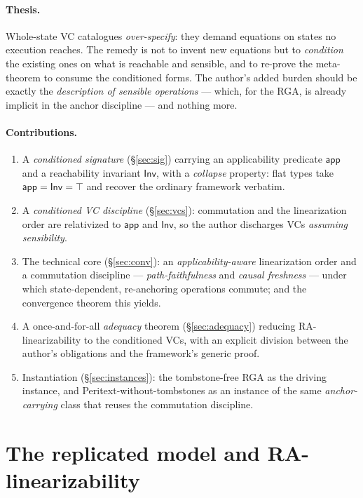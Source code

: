 \documentclass[11pt]{article}
\newcommand{\Inv}{\mathsf{Inv}}
\newcommand{\app}{\mathsf{app}}
\begin{document}
\paragraph{Thesis.}
Whole-state VC catalogues \emph{over-specify}: they demand equations on states no
execution reaches. The remedy is not to invent new equations but to
\emph{condition} the existing ones on what is reachable and sensible, and to
re-prove the meta-theorem to consume the conditioned forms. The author's added
burden should be exactly the \emph{description of sensible operations} --- which,
for the RGA, is already implicit in the anchor discipline --- and nothing more.

\paragraph{Contributions.}
\begin{enumerate}[leftmargin=1.6em]
\item A \emph{conditioned signature} (\S\ref{sec:sig}) carrying an applicability
  predicate $\app$ and a reachability invariant $\Inv$, with a \emph{collapse}
  property: flat types take $\app=\Inv=\top$ and recover the ordinary framework
  verbatim.
\item A \emph{conditioned VC discipline} (\S\ref{sec:vcs}): commutation and the
  linearization order are relativized to $\app$ and $\Inv$, so the author
  discharges VCs \emph{assuming sensibility}.
\item The technical core (\S\ref{sec:conv}): an \emph{applicability-aware}
  linearization order and a commutation discipline --- \emph{path-faithfulness}
  and \emph{causal freshness} --- under which state-dependent, re-anchoring
  operations commute; and the convergence theorem this yields.
\item A once-and-for-all \emph{adequacy} theorem (\S\ref{sec:adequacy}) reducing
  RA-linearizability to the conditioned VCs, with an explicit division between
  the author's obligations and the framework's generic proof.
\item Instantiation (\S\ref{sec:instances}): the tombstone-free RGA as the
  driving instance, and Peritext-without-tombstones as an instance of the same
  \emph{anchor-carrying} class that reuses the commutation discipline.
\end{enumerate}

\section{The replicated model and RA-linearizability}
\label{sec:model}
\end{document}
